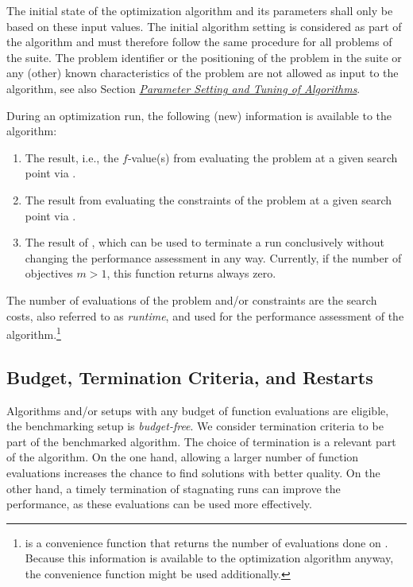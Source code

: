 \documentclass[letterpaper,12pt,english]{article}
\begin{document}
The initial state of the optimization algorithm and its parameters shall only be based on
these input values. The initial algorithm setting is considered as part of
the algorithm and must therefore follow the same procedure for all problems of the
suite. The problem identifier or the positioning of the problem in the suite or
any (other) known characteristics of the problem are not
allowed as input to the algorithm, see also Section
{\hyperref[index:sec\string-tuning]{\emph{Parameter Setting and Tuning of Algorithms}}}.

During an optimization run, the following (new) information is available to
the algorithm:
\begin{enumerate}
\item {} 
The result, i.e., the \(f\)-value(s) from evaluating the problem
at a given search point
via \href{http://numbbo.github.io/coco-doc/C/coco\_8h.html\#aabbc02b57084ab069c37e1c27426b95c}{}.

\item {} 
The result from evaluating the constraints of the problem at a
given search point via \href{http://numbbo.github.io/coco-doc/C/coco\_8h.html\#ab5cce904e394349ec1be1bcdc35967fa}{}.

\item {} 
The result of \href{http://numbbo.github.io/coco-doc/C/coco\_8h.html\#a1164d85fd641ca48046b943344ae9069}{}, which can be used
to terminate a run conclusively without changing the performance assessment
in any way. Currently, if the number of objectives \(m > 1\), this
function returns always zero.

\end{enumerate}

The number of evaluations of the problem and/or constraints are the search
costs, also referred to as \emph{runtime}, and used for the performance
assessment of the algorithm.\footnote[2]{
\href{http://numbbo.github.io/coco-doc/C/coco\_8h.html\#a6ad88cdba2ffd15847346d594974067f}{} is a
convenience function that returns the number of evaluations done on .
Because this information is available to the optimization algorithm anyway,
the convenience function might be used additionally.
}


\subsection{Budget, Termination Criteria, and Restarts}
\label{index:sec-budget}\label{index:budget-termination-criteria-and-restarts}
Algorithms and/or setups with any budget of function evaluations are
eligible, the benchmarking setup is \emph{budget-free}.
We consider termination criteria to be part of the benchmarked algorithm.
The choice of termination is a relevant part of the algorithm.
On the one hand, allowing a larger number of function evaluations increases the chance to find solutions with better quality. On the other hand, a timely
termination of stagnating runs can improve the performance, as these evaluations
can be used more effectively.
\end{document}

